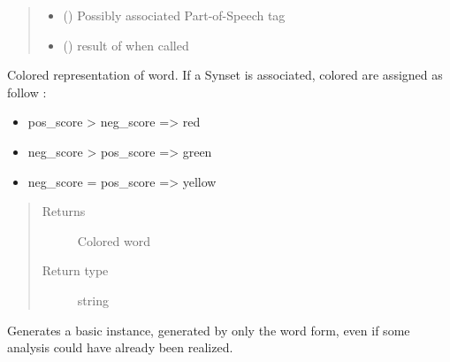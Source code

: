 \documentclass[letterpaper,10pt,english]{sphinxmanual}
\begin{document}
\begin{fulllineitems}
\begin{quote}
\begin{description}
\begin{itemize}
\item {} 
 () \textendash{} Possibly associated Part-of-Speech tag

\item {} 
 () \textendash{} result of {\hyperref[\detokenize{classes:loacore.classes.classes.Word.compute_freeling_word}]{}} when called

\end{itemize}

\end{description}\end{quote}

\begin{fulllineitems}
\label{\detokenize{classes:loacore.classes.classes.Word.colored_word}}
Colored representation of word. If a Synset is associated, colored are assigned as follow :
\begin{itemize}
\item {} 
pos\_score \textgreater{} neg\_score =\textgreater{} red

\item {} 
neg\_score \textgreater{} pos\_score =\textgreater{} green

\item {} 
neg\_score = pos\_score =\textgreater{} yellow

\end{itemize}
\begin{quote}\begin{description}
\item[{Returns}] \leavevmode
Colored word

\item[{Return type}] \leavevmode
string

\end{description}\end{quote}

\end{fulllineitems}


\begin{fulllineitems}
\label{\detokenize{classes:loacore.classes.classes.Word.compute_freeling_word}}
Generates a basic  instance, generated by only the word form, even if some analysis
could have already been realized.


\end{fulllineitems}
\end{fulllineitems}
\end{document}
